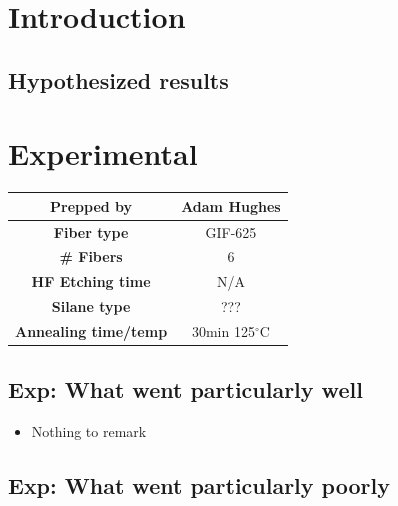 \documentclass{article}
\begin{document}
\newpage

\tableofcontents

\newpage

\hypertarget{intro}{\section{Introduction}}


\subsection{Hypothesized results}

\hypertarget{exp}{\section{Experimental}}

\begin{center}
\begin{tabular}{| c | c |}
 \hline
 {\bf Prepped by} & Adam Hughes \\ \hline
 {\bf Fiber type} & GIF-625 \\ \hline
 {\bf \# Fibers} & 6  \\ \hline
 {\bf HF Etching time} & N/A \\ \hline
 {\bf Silane type} & ??? \\ \hline
 {\bf Annealing time/temp} & 30min 125$^\circ$C  \\ \hline
\end{tabular}
\end{center}

\vspace{.3cm}


\subsection{Exp: {\color{blue} What went particularly well}}

\begin{itemize}
\item{Nothing to remark}
\end{itemize}

\subsection{Exp: {\color{red} What went particularly poorly}}
\end{document}
